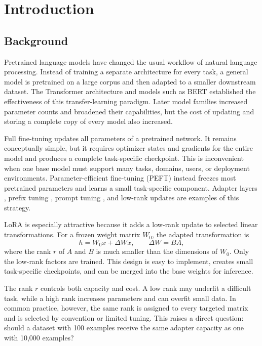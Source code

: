 \chapter{Introduction}
\label{chap:introduction}

\section{Background}

Pretrained language models have changed the usual workflow of natural language processing.
Instead of training a separate architecture for every task, a general model is pretrained on a
large corpus and then adapted to a smaller downstream dataset. The Transformer architecture
\citep{vaswani2017attention} and models such as BERT \citep{devlin2019bert} established the
effectiveness of this transfer-learning paradigm. Later model families increased parameter counts
and broadened their capabilities, but the cost of updating and storing a complete copy of every
model also increased.

Full fine-tuning updates all parameters of a pretrained network. It remains conceptually simple,
but it requires optimizer states and gradients for the entire model and produces a complete
task-specific checkpoint. This is inconvenient when one base model must support many tasks,
domains, users, or deployment environments. Parameter-efficient fine-tuning (PEFT) instead freezes
most pretrained parameters and learns a small task-specific component. Adapter layers
\citep{houlsby2019parameter}, prefix tuning \citep{li2021prefix}, prompt tuning
\citep{lester2021power}, and low-rank updates are examples of this strategy.

LoRA \citep{hu2022lora} is especially attractive because it adds a low-rank update to selected
linear transformations. For a frozen weight matrix $W_0$, the adapted transformation is
\begin{equation}
  h = W_0 x + \Delta W x,
  \qquad
  \Delta W = BA,
  \label{eq:lora-basic}
\end{equation}
where the rank $r$ of $A$ and $B$ is much smaller than the dimensions of $W_0$. Only the low-rank
factors are trained. This design is easy to implement, creates small task-specific checkpoints,
and can be merged into the base weights for inference.

The rank $r$ controls both capacity and cost. A low rank may underfit a difficult task, while a
high rank increases parameters and can overfit small data. In common practice, however, the same
rank is assigned to every targeted matrix and is selected by convention or limited tuning.
This raises a direct question: should a dataset with 100 examples receive the same adapter capacity
as one with 10,000 examples?

